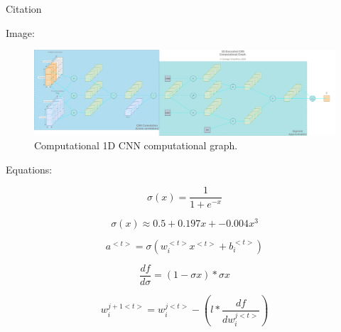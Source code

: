 \documentclass{article}
\begin{document}
  Citation \autocite{gentry2009fully, Goodfellow-et-al-2016}

  Image:
  \begin{figure}[th!]
    \centering
    \includegraphics[width=\textwidth]{encrypted_cnn.png}
    \caption{Computational 1D CNN computational graph.}
    \label{fig:gan}
  \end{figure}

  Equations:

  \begin{equation}
    \label{sigmoid}
    \sigma(x) = \frac{1}{1+e^{-x}}
  \end{equation}

  \begin{equation}
    \label{sigmoid_approx}
    \sigma(x) \approx 0.5 + 0.197x + -0.004x^3
  \end{equation}

  \begin{equation}
    \label{cnn_activation}
    a^{<t>}=\sigma(w_{i}^{<t>}x^{<t>}+b_i^{<t>})
  \end{equation}

  \begin{equation}
    \label{gradient}
    \frac{df}{d\sigma} = (1-\sigma{x}) * \sigma{x}
  \end{equation}

  \begin{equation}
    \label{weight_update}
    w_i^{j+1<t>} = w_i^{j<t>} - (l * \frac{df}{dw_i^{j<t>}})
  \end{equation}

  \printbibliography
\end{document}
